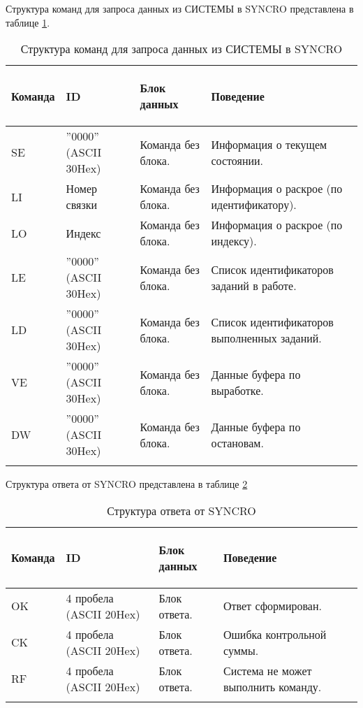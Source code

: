 Структура команд для запроса данных из СИСТЕМЫ в SYNCRO представлена в таблице \ref{tab:fosber_comand_return}.

\scriptsize
\begin{longtable}{|p{15mm}|p{35mm}|p{40mm}|p{70mm}|}
\hline
{\bf {\bf \parbox[c][5mm]{15mm}{\raggedright Команда}}} & {\it {\bf \parbox[c]{35mm}{\raggedright ID}}} & {\bf {\bf \parbox[c]{40mm}{\raggedright Блок данных}}} & {\bf \parbox[c]{70mm}{\raggedright Поведение}} \\
\hline
\parbox[c][5mm]{15mm}{SE} & \parbox{35mm}{''0000'' (ASCII 30Hex)} & \parbox{40mm}{Команда без блока.} & \parbox{70mm}{Информация о текущем состоянии.} \\
\hline
\parbox[c][5mm]{15mm}{LI} & \parbox{35mm}{Номер связки} & \parbox{40mm}{Команда без блока.} & \parbox{70mm}{Информация о раскрое (по идентификатору).} \\
\hline
\parbox[c][5mm]{15mm}{LO} & \parbox{35mm}{Индекс} & \parbox{40mm}{Команда без блока.} & \parbox{70mm}{Информация о раскрое (по индексу).} \\
\hline
\parbox[c][5mm]{15mm}{LE} & \parbox{35mm}{''0000'' (ASCII 30Hex)} & \parbox{40mm}{Команда без блока.} & \parbox{70mm}{Список идентификаторов заданий в работе.} \\
\hline
\parbox[c][5mm]{15mm}{LD} & \parbox{35mm}{''0000'' (ASCII 30Hex)} & \parbox{40mm}{Команда без блока.} & \parbox{70mm}{Список идентификаторов выполненных заданий.} \\
\hline
\parbox[c][5mm]{15mm}{VE} & \parbox{35mm}{''0000'' (ASCII 30Hex)} & \parbox{40mm}{Команда без блока.} & \parbox{70mm}{Данные буфера по выработке.} \\
\hline
\parbox[c][5mm]{15mm}{DW} & \parbox{35mm}{''0000'' (ASCII 30Hex)} & \parbox{40mm}{Команда без блока.} & \parbox{70mm}{Данные буфера по остановам.} \\
\hline
\caption{Структура команд для запроса данных из СИСТЕМЫ в SYNCRO}\label{tab:fosber_comand_return}
\end{longtable}  
\normalsize

Структура ответа от SYNCRO представлена в таблице \ref{tab:fosber_answer_return}

\scriptsize
\begin{longtable}{|p{15mm}|p{35mm}|p{40mm}|p{70mm}|}
\hline
{\bf {\bf \parbox[c][5mm]{15mm}{\raggedright Команда}}} & {\it {\bf \parbox[c]{40mm}{\raggedright ID}}} & {\it {\bf \parbox[c]{40mm}{\raggedright Блок данных}}} & {\it {\bf \parbox[c]{70mm}{\raggedright Поведение}}} \\
\hline
\parbox[c][5mm]{15mm}{OK} & \parbox{35mm}{4 пробела (ASCII 20Hex)} & \parbox{40mm}{Блок ответа.} & \parbox{70mm}{Ответ сформирован.} \\
\hline
\parbox[c][5mm]{15mm}{CK} & \parbox{35mm}{4 пробела (ASCII 20Hex)} & \parbox{40mm}{Блок ответа.} & \parbox{70mm}{Ошибка контрольной суммы.} \\
\hline
\parbox[c][5mm]{15mm}{RF} & \parbox{35mm}{4 пробела (ASCII 20Hex)} & \parbox{40mm}{Блок ответа.} & \parbox{70mm}{Система не может выполнить команду.} \\
\hline
\caption{Структура ответа от SYNCRO}\label{tab:fosber_answer_return}
\end{longtable}  
\normalsize

